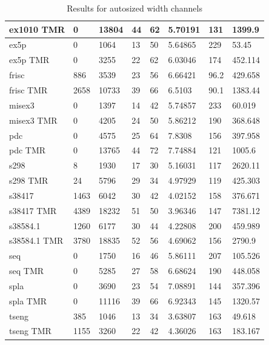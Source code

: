 \documentclass[12pt,final,oneside]{dwThesis} %
\begin{document}
\begin{table}
\begin{adjustwidth}{-1cm}{-1.2cm}
\begin{tabularx}{1.1\textwidth}{llllp{1.5cm}p{2.2cm}p{1.5cm}X}
            ex1010 TMR & 0 & 13804 & 44 & 62 & 5.70191 & 131 & 1399.9\\\midrule
            ex5p & 0 & 1064 & 13 & 50 & 5.64865 & 229 & 53.45\\
            ex5p TMR & 0 & 3255 & 22 & 62 & 6.03046 & 174 & 452.114\\\midrule
            frisc & 886 & 3539 & 23 & 56 & 6.66421 & 96.2 & 429.658\\
            frisc TMR & 2658 & 10733 & 39 & 66 & 6.5103 & 90.1 & 1383.44\\\midrule
            misex3 & 0 & 1397 & 14 & 42 & 5.74857 & 233 & 60.019\\
            misex3 TMR & 0 & 4205 & 24 & 50 & 5.86212 & 190 & 368.648\\\midrule
            pdc & 0 & 4575 & 25 & 64 & 7.8308 & 156 & 397.958\\
            pdc TMR & 0 & 13765 & 44 & 72 & 7.74884 & 121 & 1005.6\\\midrule
            s298 & 8 & 1930 & 17 & 30 & 5.16031 & 117 & 2620.11\\
            s298 TMR & 24 & 5796 & 29 & 34 & 4.97929 & 119 & 425.303\\\midrule
            s38417 & 1463 & 6042 & 30 & 42 & 4.02152 & 158 & 376.671\\
            s38417 TMR & 4389 & 18232 & 51 & 50 & 3.96346 & 147 & 7381.12\\\midrule
            s38584.1 & 1260 & 6177 & 30 & 44 & 4.22808 & 200 & 459.989\\
            s38584.1 TMR & 3780 & 18835 & 52 & 56 & 4.69062 & 156 & 2790.9\\\midrule
            seq & 0 & 1750 & 16 & 46 & 5.86111 & 207 & 105.526\\
            seq TMR & 0 & 5285 & 27 & 58 & 6.68624 & 190 & 448.058\\\midrule
            spla & 0 & 3690 & 23 & 54 & 7.08891 & 144 & 357.396\\
            spla TMR & 0 & 11116 & 39 & 66 & 6.92343 & 145 & 1320.57\\\midrule
            tseng & 385 & 1046 & 13 & 34 & 3.63807 & 163 & 49.618\\
            tseng TMR & 1155 & 3260 & 22 & 42 & 4.36026 & 163 & 183.167\\\bottomrule
         \end{tabularx}
         \caption{Results for autosized width channels}
         \label{Results-1}
      \end{adjustwidth}
   \end{table}
   
\end{document}
